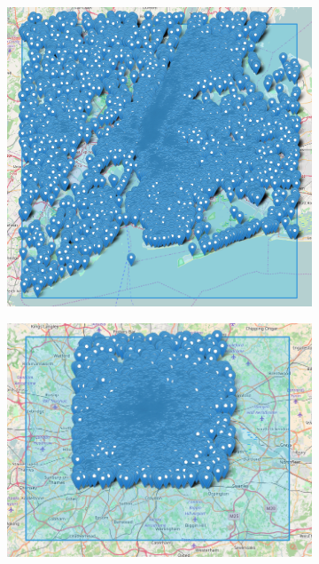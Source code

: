 \begin{figure}[htbp]
	\centering
	\begin{subfigure}[htbp]{0.3\textwidth}
		\centering
		\includegraphics[width=1\linewidth]{figures/nyc_markers.png}
		\caption{}
		\label{subfig:nyc_markers}
	\end{subfigure}
	\quad
	\begin{subfigure}[htbp]{0.3\textwidth}
		\centering
		\includegraphics[width=1\linewidth]{figures/london_markers.png}
		\caption{}
		\label{subfig:london_markers}

\end{subfigure}
\end{figure}
